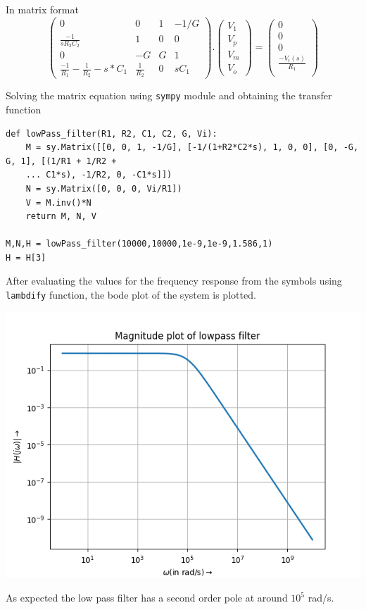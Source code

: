\documentclass[12pt, a4paper]{report}
\begin{document}
In matrix format
\begin{equation*}
\begin{pmatrix}
0   & 0 & 1  & -1/G \\
\frac{-1}{sR_2C_2}  & 1 & 0 & 0\\
0  & -G & G & 1 \\
\frac{-1}{R_1} - \frac{1}{R_2} - s*C_1 & \frac{1}{R_2} & 0 & sC_1
\end{pmatrix}
.
\begin{pmatrix}
V_1\\
V_p\\
V_m \\
V_o
\end{pmatrix}
=
\begin{pmatrix}
0 \\
0 \\
0 \\
\frac{-V_i(s)}{R_1} \\
\end{pmatrix}
\end{equation*}

Solving the matrix equation using \texttt{sympy} module and obtaining the transfer function
\begin{verbatim}
def lowPass_filter(R1, R2, C1, C2, G, Vi):
    M = sy.Matrix([[0, 0, 1, -1/G], [-1/(1+R2*C2*s), 1, 0, 0], [0, -G, G, 1], [(1/R1 + 1/R2 +
    ... C1*s), -1/R2, 0, -C1*s]])
    N = sy.Matrix([0, 0, 0, Vi/R1])
    V = M.inv()*N
    return M, N, V

M,N,H = lowPass_filter(10000,10000,1e-9,1e-9,1.586,1)
H = H[3]
\end{verbatim}

After evaluating the values for the frequency response from the symbols using \texttt{lambdify} function, the bode plot of the system is plotted.

\begin{center}
	\includegraphics[scale=0.82]{Figure_1.png} 
	\label{fig:rawdata}
\end{center}
As expected the low pass filter has a second order pole at around $10^5$ rad/s.
\end{document}
